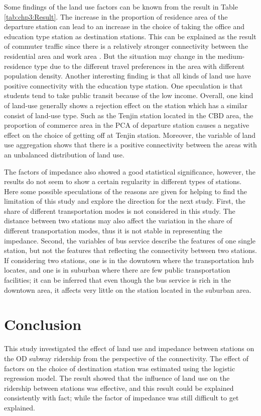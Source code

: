 %
Some findings of the land use factors can be known from the result in Table \ref{tab:chp3:Result}. The increase in the proportion of residence area of the departure station can lead to an increase in the choice of taking the office and education type station as destination stations. This can be explained as the result of commuter traffic since there is a relatively stronger connectivity between the residential area and work area \cite{badoe2000transportation}. But the situation may change in the medium-residence type due to the different travel preferences in the area with different population density. Another interesting finding is that all kinds of land use have positive connectivity with the education type station. One speculation is that students tend to take public transit because of the low income. Overall, one kind of land-use generally shows a rejection effect on the station which has a similar consist of land-use type. Such as the Tenjin station located in the CBD area, the proportion of commerce area in the PCA of departure station causes a negative effect on the choice of getting off at Tenjin station. Moreover, the variable of land use aggregation shows that there is a positive connectivity between the areas with an unbalanced distribution of land use.

%
The factors of impedance also showed a good statistical significance, however, the results do not seem to show a certain regularity in different types of stations. Here some possible speculations of the reasons are given for helping to find the limitation of this study and explore the direction for the next study. First, the share of different transportation modes is not considered in this study. The distance between two stations may also affect the variation in the share of different transportation modes, thus it is not stable in representing the impedance.  Second, the variables of bus service describe the features of one single station, but not the features that reflecting the connectivity between two stations. If considering two stations, one is in the downtown where the transportation hub locates, and one is in suburban where there are few public transportation facilities; it can be inferred that even though the bus service is rich in the downtown area, it affects very little on the station located in the suburban area.

%
\section{Conclusion}
%
This study investigated the effect of land use and impedance between stations on the OD subway ridership from the perspective of the connectivity. The effect of factors on the choice of destination station was estimated using the logistic regression model. The result showed that the influence of land use on the ridership between stations was effective, and this result could be explained consistently with fact; while the factor of impedance was still difficult to get explained.

